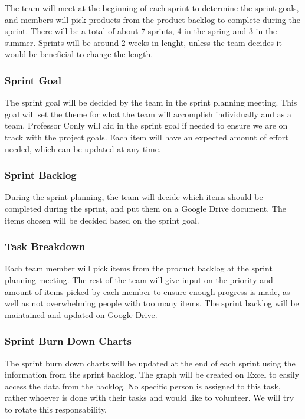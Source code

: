 The team will meet at the beginning of each sprint to determine the sprint goals, and members will pick products from the product backlog to complete during the sprint. There will be a total of about 7 sprints, 4 in the spring and 3 in the summer. Sprints will be around 2 weeks in lenght, unless the team decides it would be beneficial to change the length.

\subsubsection{Sprint Goal}

The sprint goal will be decided by the team in the sprint planning meeting. This goal will set the theme for what the team will accomplish individually and as a team. Professor Conly will aid in the sprint goal if needed to ensure we are on track with the project goals. Each item will have an expected amount of effort needed, which can be updated at any time.

\subsubsection{Sprint Backlog}

During the sprint planning, the team will decide which items should be completed during the sprint, and put them on a Google Drive document. The items chosen will be decided based on the sprint goal.

\subsubsection{Task Breakdown}

Each team member will pick items from the product backlog at the sprint planning meeting. The rest of the team will give input on the priority and amount of items picked by each member to ensure enough progress is made, as well as not overwhelming people with too many items. The sprint backlog will be maintained and updated on Google Drive.

\subsubsection{Sprint Burn Down Charts}

The sprint burn down charts will be updated at the end of each sprint using the information from the sprint backlog. The graph will be created on Excel to easily access the data from the backlog. No specific person is assigned to this task, rather whoever is done with their tasks and would like to volunteer. We will try to rotate this responsability.

